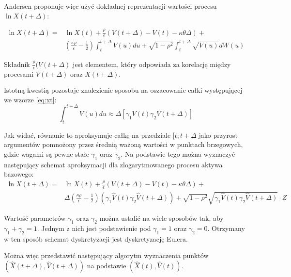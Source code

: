\documentclass{pracamgr}
\begin{document}
Andersen proponuje więc użyć dokładnej reprezentacji wartości procesu $\ln X(t + \Delta)$:

\begin{equation}
\begin{aligned}
\label{eq:xt}
\ln X(t + \Delta) = & \ln X(t)  + \frac{\rho}{\epsilon} (V(t + \Delta)  - V(t) - \kappa \theta \Delta) + \\
& (\frac{\kappa \rho}{\epsilon} - \frac{1}{2})
\int_t^{t+\Delta} V(u) du + \sqrt{1-\rho^2} \int_t^{t+\Delta} \sqrt{V(u)}dW(u)
\end{aligned}
\end{equation}

Składnik $\frac{\rho}{\epsilon} (V(t + \Delta)$ jest elementem, który odpowiada za korelację między 
procesami $V(t + \Delta)$ oraz $X(t + \Delta)$.

Istotną kwestią pozostaje znalezienie sposobu na oszacowanie całki występującej we wzorze \ref{eq:xt}:
\begin{equation}
  \int_t^{t+\Delta}  V(u) du \approx \Delta [\gamma_1 V(t) \gamma_2 V(t + \Delta)]
\end{equation}

Jak widać, równanie to aproksymuje całkę na przedziale $[t; t + \Delta$ 
jako przyrost argumentów pomnożony przez średnią ważoną wartości w punktach brzegowych, gdzie wagami 
są pewne stałe $\gamma_1$ oraz $\gamma_2$. Na podstawie tego można wyznaczyć następujący schemat aproksymacji
dla zlogarytmowanego procesu aktywa bazowego:
\begin{equation}
\begin{aligned}
\label{eq:xhatt}
\ln X(t + \Delta) = & \ln X(t)  + \frac{\rho}{\epsilon} (V(t + \Delta)  - V(t) - \kappa \theta \Delta) + \\
& \Delta (\frac{\kappa \rho}{\epsilon} - \frac{1}{2}) (\gamma_1 \hat{V}(t) \gamma_2 \hat{V}(t + \Delta))
 +  \sqrt{1-\rho^2} \sqrt{\gamma_1 \hat{V}(t) \gamma_2 \hat{V}(t + \Delta)} \cdot Z
\end{aligned}
\end{equation}

Wartość parametrów $\gamma_1$ oraz $\gamma_2$ można ustalić na wiele sposobów tak, aby $\gamma_1 + \gamma_2 = 1$. 
Jednym z nich jest podstawienie pod $\gamma_1 = 1$ oraz $\gamma_2 = 0$. Otrzymany w ten sposób schemat dyskretyzacji jest  dyskretyzację Eulera. 

Można więc przedstawić następujący algorytm wyznaczenia punktów $(\hat{X}(t+ \Delta), \hat{V}(t+ \Delta))$ na podstawie $(\hat{X}(t), \hat{V}(t))$.
\end{document}
